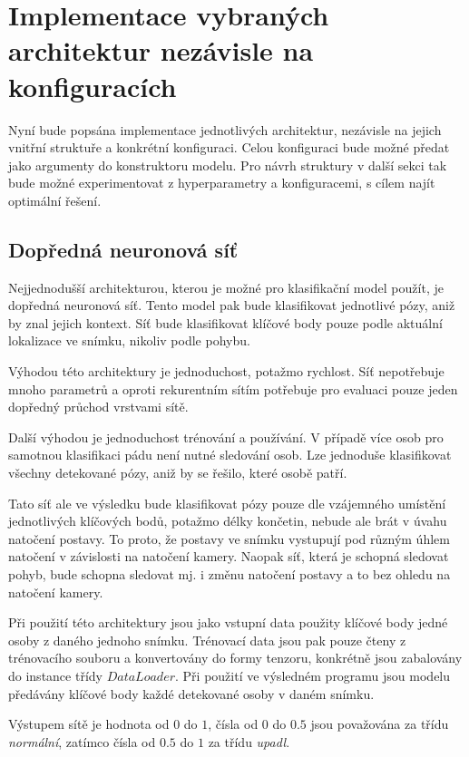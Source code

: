 \section{Implementace vybraných architektur nezávisle na konfiguracích}
\label{sec:SelectedArchitectures}

Nyní bude popsána implementace jednotlivých architektur, nezávisle na jejich
vnitřní struktuře a konkrétní konfiguraci. Celou konfiguraci bude možné předat
jako argumenty do konstruktoru modelu. Pro návrh struktury v další sekci tak
bude možné experimentovat z hyperparametry a konfiguracemi, s cílem najít
optimální řešení.

\subsection{Dopředná neuronová síť}

Nejjednodušší architekturou, kterou je možné pro klasifikační model použít, je
dopředná neuronová síť. Tento model pak bude klasifikovat jednotlivé pózy, aniž
by znal jejich kontext. Síť bude klasifikovat klíčové body pouze podle aktuální
lokalizace ve snímku, nikoliv podle pohybu.

Výhodou této architektury je jednoduchost, potažmo rychlost. Síť nepotřebuje
mnoho parametrů a oproti rekurentním sítím potřebuje pro evaluaci pouze jeden
dopředný průchod vrstvami sítě.

Další výhodou je jednoduchost trénování a používání. V případě více osob pro
samotnou klasifikaci pádu není nutné sledování osob. Lze jednoduše klasifikovat
všechny detekované pózy, aniž by se řešilo, které osobě patří.

Tato síť ale ve výsledku bude klasifikovat pózy pouze dle vzájemného umístění
jednotlivých klíčových bodů, potažmo délky končetin, nebude ale brát v úvahu
natočení postavy. To proto, že postavy ve snímku vystupují pod různým úhlem
natočení v závislosti na natočení kamery. Naopak síť, která je schopná sledovat
pohyb, bude schopna sledovat mj. i změnu natočení postavy a to bez ohledu na
natočení kamery.

Při použití této architektury jsou jako vstupní data použity klíčové body jedné
osoby z daného jednoho snímku. Trénovací data jsou pak pouze čteny z
trénovacího souboru a konvertovány do formy tenzoru, konkrétně jsou zabalovány
do instance třídy $DataLoader$. Při použití ve výsledném programu jsou modelu
předávány klíčové body každé detekované osoby v daném snímku.

Výstupem sítě je hodnota od $0$ do $1$, čísla od $0$ do $0.5$ jsou považována
za třídu \textit{normální}, zatímco čísla od $0.5$ do $1$ za třídu
\textit{upadl}.

